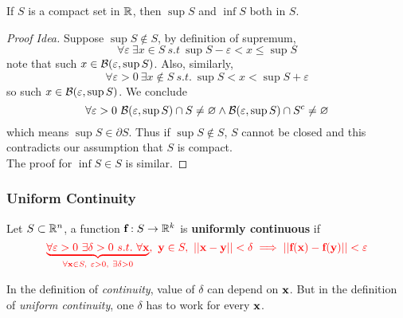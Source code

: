 \documentclass[11pt]{article}
\newcommand{\vef}[0]{\ve{f}}
\begin{document}
				\begin{proposition}
					If $S$ is a compact set in $\mathbb{R}$, then $\sup S$ and $\inf S$ both in $S$.
					\begin{proof}[Proof Idea]
						Suppose $\sup S \notin S$, by definition of supremum,
						\begin{equation}
							\forall \varepsilon\ \exists x \in S\ s.t\ \sup S - \varepsilon < x \leq \sup S
						\end{equation}
						note that such $x \in \mathcal{{B}}(\varepsilon, \sup S)$. Also, similarly,
						\begin{equation}
							\forall \varepsilon > 0\ \exists x \notin S\ s.t.\ \sup S < x < \sup S + \varepsilon
						\end{equation}
						so such $x \in \mathcal{{B}}(\varepsilon, \sup S)$. We conclude
						\begin{equation}
							\forall \varepsilon > 0\ \mathcal{{B}}(\varepsilon, \sup S) \cap S \neq \varnothing \land \mathcal{{B}}(\varepsilon, \sup S) \cap S^c \neq \varnothing
						\end{equation} 
						which means $\sup S \in \partial S$. Thus if $\sup S \notin S$, $S$ cannot be closed and this contradicts our assumption that $S$ is compact. \\
						The proof for $\inf S \in S$ is similar.
					\end{proof}
				\end{proposition}
				
			\subsubsection{Uniform Continuity}
				\begin{definition}
					Let $S \subset \mathbb{R}^n$, a function $\textbf{f}: S \to \mathbb{R}^k$ is \textbf{uniformly continuous} if 
					\begin{equation}
						\red{
						\underbrace{\forall \varepsilon > 0\ \exists \delta > 0\ s.t.\ \forall \vex}_{\forall \vex \in S,\ \varepsilon > 0,\ \exists \delta > 0}
						,\ \vey \in S,\ \norm{\vex - \vey} < \delta \implies \norm{\vef(\vex) - \vef(\vey)} < \varepsilon
						}
					\end{equation}
				\end{definition}
				
				\begin{remark}
					In the definition of \emph{continuity}, value of $\delta$ can depend on $\textbf{x}$. But in the definition of \emph{uniform continuity}, one $\delta$ has to work for every $\textbf{x}$. 
				\end{remark}
				
\end{document}
